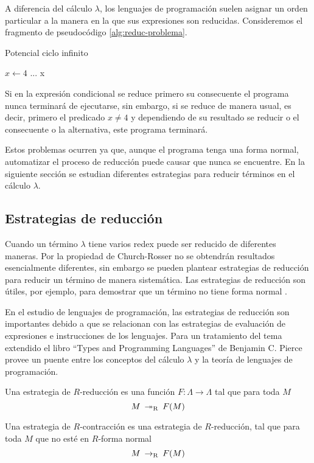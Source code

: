 A diferencia del cálculo \( λ \), los lenguajes de programación suelen asignar un orden particular a la manera en la que sus expresiones son reducidas. Consideremos el fragmento de pseudocódigo \ref{alg:reduc-problema}.

\begin{algorithm}
  \caption{Potencial ciclo infinito}
  \label{alg:reduc-problema}
  \begin{algorithmic}
    \STATE \( x \leftarrow 4 \)
    \LOOP
    \STATE \( ... \)
    \ENDLOOP
    \ELSE
    \RETURN x
    \ENDIF
  \end{algorithmic}
\end{algorithm}

Si en la expresión condicional se reduce primero su consecuente el programa nunca terminará de ejecutarse, sin embargo, si se reduce de manera usual, es decir, primero el predicado \( x \not= 4 \) y dependiendo de su resultado se reducir o el consecuente o la alternativa, este programa terminará.

Estos problemas ocurren ya que, aunque el programa tenga una forma normal, automatizar el proceso de reducción puede causar que nunca se encuentre. En la siguiente sección se estudian diferentes estrategias para reducir términos en el cálculo \( λ \).

\subsection{Estrategias de reducción}
\label{sec:estrategias-reduccion}

Cuando un término \( λ \) tiene varios redex puede ser reducido de diferentes maneras. Por la propiedad de Church-Rosser no se obtendrán resultados esencialmente diferentes, sin embargo se pueden plantear estrategias de reducción para reducir un término de manera sistemática. Las estrategias de reducción son útiles, por ejemplo, para demostrar que un término no tiene forma normal \cite[p.~324]{Barendregt:Bible}.

En el estudio de lenguajes de programación, las estrategias de reducción son importantes debido a que se relacionan con las estrategias de evaluación de expresiones e instrucciones de los lenguajes. Para un tratamiento del tema extendido el libro ``Types and Programming Languages'' de Benjamin C. Pierce \cite{Pierce:TypesAndPLangs} provee un puente entre los conceptos del cálculo \( λ \) y la teoría de lenguajes de programación.

\begin{defn}
  Una estrategia de \( R \)-reducción es una función \( F \colon Λ \to Λ \) tal que para toda \( M \)
  \[ M \ \operatorname{\twoheadrightarrow_{R}}\  F(M) \]

  Una estrategia de \( R \)-contracción es una estrategia de \( R \)-reducción, tal que para toda \( M \) que no esté en \( R \)-forma normal
  \[ M \ \operatorname{\rightarrow_{R}}\  F(M) \]
\end{defn}

